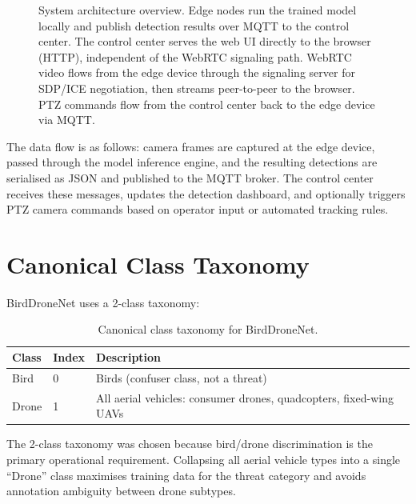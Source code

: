 \documentclass[12pt,a4paper]{report}
\renewcommand{\arraystretch}{1.1}
\begin{document}
\begin{figure}[H]
\caption[System architecture overview]{System architecture overview. Edge nodes run the trained model
locally and publish detection results over MQTT to the control center. The
control center serves the web UI directly to the browser (HTTP), independent
of the WebRTC signaling path. WebRTC video flows from the edge device through
the signaling server for SDP/ICE negotiation, then streams peer-to-peer to
the browser. PTZ commands flow from the control center back to the edge device
via MQTT.}
\label{fig:system_arch}
\end{figure}

The data flow is as follows: camera frames are captured at the edge device,
passed through the model inference engine, and the resulting detections
are serialised as JSON and published to the MQTT broker. The control center
receives these messages, updates the detection dashboard, and optionally
triggers PTZ camera commands based on operator input or automated tracking
rules.

\section{Canonical Class Taxonomy}

BirdDroneNet uses a 2-class taxonomy:

\begin{table}[H]
\centering
\caption[Canonical class taxonomy]{Canonical class taxonomy for BirdDroneNet.}
\renewcommand{\arraystretch}{0.9}
\begin{tabular}{|l|l|p{8.5cm}|}
\hline
\rowcolor{gray!20}
\textbf{Class} & \textbf{Index} & \textbf{Description} \\
\hline
Bird  & 0 & Birds (confuser class, not a threat) \\
\hline
Drone & 1 & All aerial vehicles: consumer drones, quadcopters, fixed-wing UAVs \\
\hline
\end{tabular}
\end{table}

The 2-class taxonomy was chosen because bird/drone discrimination is the
primary operational requirement. Collapsing all aerial vehicle types into
a single ``Drone'' class maximises training data for the threat category
and avoids annotation ambiguity between drone subtypes.
\end{document}
